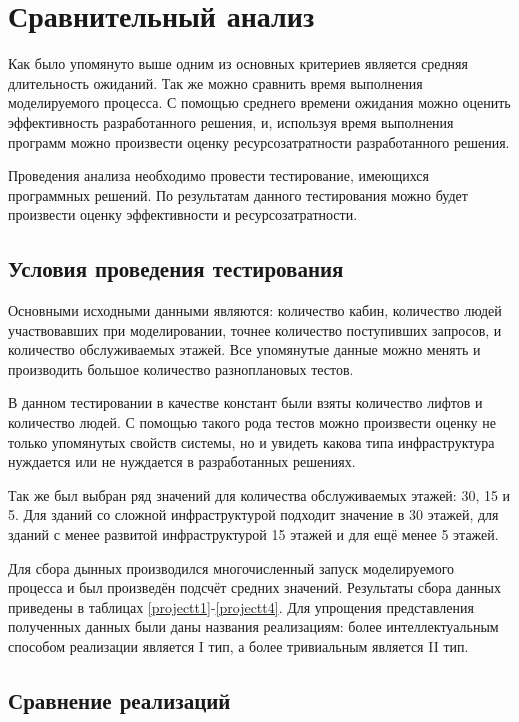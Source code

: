 \section{Сравнительный анализ}

	Как было упомянуто выше одним из основных критериев является средняя длительность ожиданий.
		Так же можно сравнить время выполнения моделируемого процесса. С помощью среднего времени ожидания
		можно оценить эффективность разработанного решения, и, используя время выполнения программ можно
		произвести оценку ресурсозатратности разработанного решения.

	Проведения анализа необходимо провести тестирование, имеющихся программных решений.
		По результатам данного тестирования можно будет произвести оценку эффективности и ресурсозатратности.

	\subsection{Условия проведения тестирования}

		Основными исходными данными являются: количество кабин, количество людей участвовавших при моделировании,
			точнее количество поступивших запросов, и количество  обслуживаемых этажей.
			Все упомянутые данные можно менять и производить большое количество разноплановых тестов. 

		В данном тестировании в качестве констант были взяты количество лифтов и количество людей.
			С помощью такого рода тестов можно произвести оценку не только упомянутых свойств системы, но и 
			увидеть какова типа инфраструктура нуждается или не нуждается в разработанных решениях.

		Так же был выбран ряд значений для количества обслуживаемых этажей: 30, 15 и 5.
			Для зданий со сложной инфраструктурой подходит значение в 30 этажей, для зданий с менее развитой
			инфраструктурой 15 этажей и для ещё менее 5 этажей.

		 Для сбора дынных производился многочисленный запуск моделируемого процесса и был произведён подсчёт средних значений.
		 	  Результаты сбора данных приведены в таблицах \ref{projectt1}-\ref{projectt4}.
			  Для упрощения представления полученных данных были даны названия реализациям: более интеллектуальным способом
			  реализации является I тип, а более тривиальным является II тип.

	\subsection{Сравнение реализаций}

